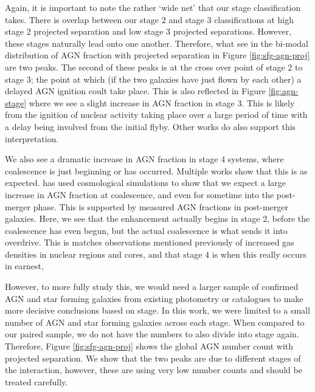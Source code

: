Again, it is important to note the rather `wide net' that our stage classification takes. There is overlap between our stage 2 and stage 3 classifications at high stage 2 projected separation and low stage 3 projected separations. However, these stages naturally lead onto one another. Therefore, what see in the bi-modal distribution of AGN fraction with projected separation in Figure \ref{fig:sfg-agn-proj} are two peaks. The second of these peaks is at the cross over point of stage 2 to stage 3; the point at which (if the two galaxies have just flown by each other) a delayed AGN ignition coult take place. This is also reflected in Figure \ref{fig:agn-stage} where we see a slight increase in AGN fraction in stage 3. This is likely from the ignition of nuclear activity taking place over a large period of time with a delay being involved from the initial flyby. Other works do also support this interpretation.

We also see a dramatic increase in AGN fraction in stage 4 systems, where coalescence is just beginning or has occurred. Multiple works show that this is as expected. \citet{2023MNRAS.519.4966B} has used cosmological simulations to show that we expect a large increase in AGN fraction at coalescence, and even for sometime into the post-merger phase. This is supported by measured AGN fractions in post-merger galaxies. Here, we see that the enhancement actually begins in stage 2, before the coalescence has even begun, but the actual coalescence is what sends it into overdrive. This is matches observations mentioned previously of increased gas densities in nuclear regions and cores, and that stage 4 is when this really occurs in earnest,

However, to more fully study this, we would need a larger sample of confirmed AGN and star forming galaxies from existing photometry or catalogues to make more decisive conclusions based on stage. In this work, we were limited to a small number of AGN and star forming galaxies across each stage. When compared to our paired sample, we do not have the numbers to also divide into stage again. Therefore, Figure \ref{fig:sfg-agn-proj} shows the global AGN number count with projected separation. We show that the two peaks are due to different stages of the interaction, however, these are using very low number counts and should be treated carefully.
 
